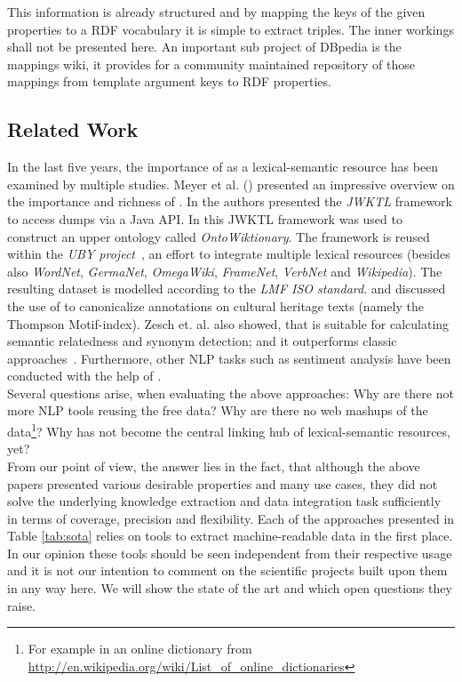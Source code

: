 This information is already structured and by mapping the keys of the given properties to a RDF vocabulary it is simple to extract triples. The inner workings shall not be presented here. An important sub project of DBpedia is the mappings wiki, it provides for a community maintained repository of those mappings from template argument keys to RDF properties.

\subsection{Related Work}\label{relatedWork}
In the last five years, the importance of \wik as a lexical-semantic resource has been examined by multiple studies.
Meyer et al. (\cite{Meyer_2010a,Meyer_2010b}) presented an impressive overview on the importance and richness of \wik. 
In \cite{Zesch_2008_jwktl} the authors presented the \emph{JWKTL} framework to access \wik dumps via a Java API.
In \cite{meyer_2011b} this JWKTL framework was used to construct an upper ontology called \emph{OntoWiktionary}.
The framework is reused within the \emph{UBY project}~\cite{Gurevych_2012}, an effort to integrate multiple lexical resources (besides \wik also \emph{WordNet}, \emph{GermaNet}, \emph{OmegaWiki}, \emph{FrameNet}, \emph{VerbNet} and \emph{Wikipedia}).
The resulting dataset is modelled according to the \emph{LMF ISO standard}\cite{iso_24613-2008}.
\cite{Moerth_2011} and \cite{Declerck-2012} discussed the use of \wik to canonicalize annotations on cultural heritage texts (namely the Thompson Motif-index). 
Zesch et. al. also showed, that \wik is suitable for calculating semantic relatedness and synonym detection; and it outperforms classic approaches~\cite{Zesch_2008,Weale_2009}. 
Furthermore, other NLP tasks such as sentiment analysis have been conducted with the help of \wik \cite{Chesley_2006}.\\
Several questions arise, when evaluating the above approaches:
Why are there not more NLP tools reusing the free \wik data?
Why are there no web mashups of the data\footnote{For example in an online dictionary from \url{http://en.wikipedia.org/wiki/List_of_online_dictionaries}}?
Why has \wik not become the central linking hub of lexical-semantic resources, yet?\\
From our point of view, the answer lies in the fact, that although the above papers presented various desirable properties and many use cases, they did not solve the underlying knowledge extraction and data integration task sufficiently in terms of coverage, precision and flexibility.
Each of the approaches presented in Table \ref{tab:sota} relies on tools to extract machine-readable data in the first place.
In our opinion these tools should  be seen independent from their respective usage and it is not our intention to comment on the scientific projects built upon them in any way here. 
We will show the state of the art and which open questions they raise. 

